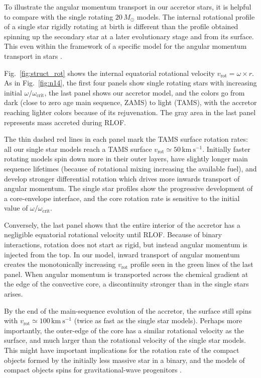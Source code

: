 \documentclass[twocolumn,twocolappendix,trackchanges]{aastex63}
\newcommand{\kms}{{\mathrm{km\ s^{-1}}}}
\DeclareRobustCommand{\Figref}[1]{Fig.~\ref{#1}}
\begin{document}
To illustrate the angular momentum transport in our accretor stars, it
is helpful to compare with the single rotating $20\,M_\odot$
models. The internal rotational profile of a single star rigidly rotating at
birth is different than the profile obtained spinning up the secondary
star at a later evolutionary stage and from its surface. This even within
the framework of a specific model for the angular momentum transport
in stars \citep{spruit:02}.

\Figref{fig:struct_rot} shows the internal equatorial
rotational velocity $v_\mathrm{rot}=\omega\times r$. As in
\Figref{fig:n14}, the first four panels show single rotating stars
with increasing initial $\omega/\omega_\mathrm{crit}$, the last panel
shows our accretor model, and the colors go from dark (close to zero
age main sequence, ZAMS) to light
(TAMS), with the accretor reaching lighter colors because of its
rejuvenation. The gray area in the last panel represents mass accreted
during RLOF.

The thin dashed red lines in each panel mark the TAMS surface rotation
rates: all our single star models reach a TAMS surface
$v_\mathrm{rot}\simeq50\,\kms$. Initially faster rotating models spin
down more in their outer layers, have slightly longer main sequence
lifetimes (because of rotational mixing increasing the available fuel), and develop stronger differential rotation which
drives more inwards transport of angular momentum. The single star
profiles show the progressive development of a core-envelope
interface, and the core rotation rate is sensitive to the initial
value of $\omega/\omega_\mathrm{crit}$.

Conversely, the last panel shows that the entire interior of the
accretor has a negligible equatorial rotational velocity until
RLOF. Because of binary interactions, rotation does not start as
rigid, but instead angular momentum is injected from the top. In our
model, inward transport of angular momentum creates the monotonically
increasing $v_\mathrm{rot}$ profile seen in the green lines of the
last panel. When angular momentum is transported across the chemical
gradient at the edge of the convective core, a discontinuity stronger
than in the single stars arises.

By the end of the main-sequence evolution of the accretor, the surface
still spins with $v_\mathrm{rot}\simeq100\,\kms$ (twice as fast as the
single star models). Perhaps more importantly, the outer-edge of the
core has a similar rotational velocity as the surface, and much larger
than the rotational velocity of the single star models. This might
have important implications for the rotation rate of the compact
objects formed by the initially less massive star in a binary, and the
models of compact objects spins for gravitational-wave progenitors
\citep[e.g.,][]{zaldarriaga:18, qin:18, callister:21}.
\end{document}

